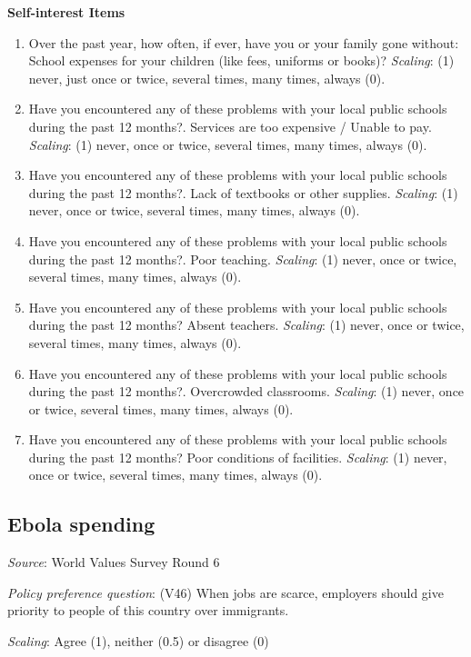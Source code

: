\documentclass[]{article}
\begin{document}
\textbf{Self-interest Items}

\begin{enumerate}
  \item Over the past year, how often, if ever, have you or your family gone without: School expenses for your children (like fees, uniforms or books)? \textit{Scaling}: (1) never, just once or twice, several times, many times, always (0).
  \item Have you encountered any of these problems with your local public schools during the past 12 months?. Services are too expensive / Unable to pay. \textit{Scaling}: (1) never, once or twice, several times, many times, always (0).
  \item Have you encountered any of these problems with your local public schools during the past 12 months?. Lack of textbooks or other supplies. \textit{Scaling}: (1) never, once or twice, several times, many times, always (0).
  \item Have you encountered any of these problems with your local public schools during the past 12 months?. Poor teaching. \textit{Scaling}: (1) never, once or twice, several times, many times, always (0).
  \item Have you encountered any of these problems with your local public schools during the past 12 months? Absent teachers. \textit{Scaling}: (1) never, once or twice, several times, many times, always (0).
  \item Have you encountered any of these problems with your local public schools during the past 12 months?. Overcrowded classrooms. \textit{Scaling}: (1) never, once or twice, several times, many times, always (0).
  \item Have you encountered any of these problems with your local public schools during the past 12 months? Poor conditions of facilities. \textit{Scaling}: (1) never, once or twice, several times, many times, always (0).
\end{enumerate}

\subsection{Ebola spending}\label{ebola-spending}

\textit{Source}: World Values Survey Round 6

\textit{Policy preference question}: (V46) When jobs are scarce,
employers should give priority to people of this country over
immigrants.

\textit{Scaling}: Agree (1), neither (0.5) or disagree (0)
\end{document}
